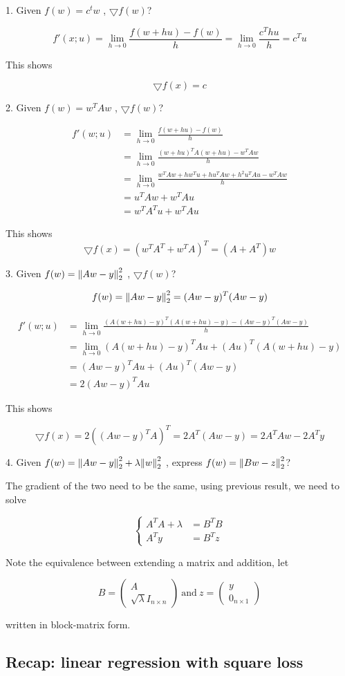 \documentclass{article}
\begin{document}
1. Given $f(w) = c^{t} w$ , $\bigtriangledown f(w)$?

$$
f'(x; u) = \lim\limits_{h \to 0}{\frac{f(w + hu) - f(w)}{h}} = \lim\limits_{h \to 0}{\frac{c^{T} h u}{h}} = c^{T} u
$$

This shows

$$
\bigtriangledown f(x) = c
$$

2. Given $f(w) = w^{T} A w$ , $\bigtriangledown f(w)$?

\begin{align*}
f'(w; u) &= \lim\limits_{h \to 0}{\frac{f(w + hu) - f(w)}{h}} \\
         &= \lim\limits_{h \to 0}{\frac{(w + hu)^{T} A (w + hu) - w^{T} A w}{h}} \\
         &= \lim\limits_{h \to 0}{ \frac{w^{T} A w + h w^{T} u + h u^{T} A w + h^2 u^{T} A u - w^{T} A w}{h} } \\
         &= u^{T} A w + w^{T} A u \\
         &= w^{T} A^{T} u + w^{T} A u
\end{align*}

This shows
$$
\bigtriangledown f(x) = (w^{T} A^{T} + w^{T} A)^{T} = (A + A^{T}) w
$$

3. Given $f(w) = \norm{Aw - y}_2^2$ , $\bigtriangledown f(w)$?

$$
f(w) = \norm{Aw - y}_2^2 = (Aw - y)^{T} (Aw - y)
$$

\begin{align*}
f'(w; u) &= \lim\limits_{h \to 0}{\frac{(A (w + hu) - y)^{T} (A (w + hu) - y) - (Aw - y)^{T} (Aw - y)}{h}} \\
         &= \lim\limits_{h \to 0}{ (A (w + hu) - y)^{T} A u + (A u)^{T} (A (w + hu) - y)} \\
         &= (A w - y)^{T} A u + (A u)^{T} (A w - y) \\
         &= 2 (A w - y)^{T} A u
\end{align*}

This shows

$$
\bigtriangledown f(x) = 2 ((A w - y)^{T} A)^{T} = 2 A^{T} (A w - y) = 2 A^{T} A w - 2 A^{T} y
$$

4. Given $f(w) = \norm{Aw - y}_2^2 + \lambda \norm{w}_2^2$ , express $f(w) = \norm{Bw - z}_2^2$?

The gradient of the two need to be the same, using previous result, we need to solve

$$
\begin{cases}
A^{T} A + \lambda &= B^{T} B \\
          A^{T} y &= B^{T} z
\end{cases}
$$

Note the equivalence between extending a matrix and addition, let

$$
B = \begin{pmatrix} A \\ \sqrt{\lambda} I_{n \times n} \end{pmatrix} ~ \text{and} ~ z = \begin{pmatrix} y \\ 0_{n \times 1} \end{pmatrix}
$$

written in block-matrix form.

\subsection{Recap: linear regression with square loss}
\end{document}
